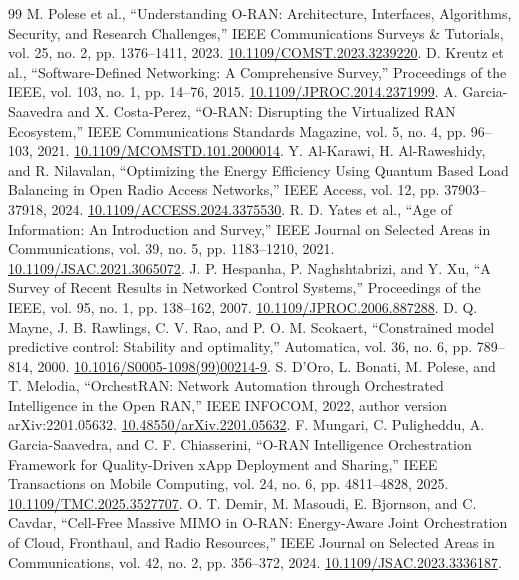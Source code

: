 \documentclass{IEEEoj}
\begin{document}
\small\begin{thebibliography}{99}\setlength{\itemsep}{2pt}
 M. Polese et al., ``Understanding O-RAN: Architecture, Interfaces, Algorithms, Security, and Research Challenges,'' IEEE Communications Surveys \& Tutorials, vol. 25, no. 2, pp. 1376--1411, 2023. \href{https://doi.org/10.1109/COMST.2023.3239220}{10.1109/COMST.2023.3239220}.
 D. Kreutz et al., ``Software-Defined Networking: A Comprehensive Survey,'' Proceedings of the IEEE, vol. 103, no. 1, pp. 14--76, 2015. \href{https://doi.org/10.1109/JPROC.2014.2371999}{10.1109/JPROC.2014.2371999}.
 A. Garcia-Saavedra and X. Costa-Perez, ``O-RAN: Disrupting the Virtualized RAN Ecosystem,'' IEEE Communications Standards Magazine, vol. 5, no. 4, pp. 96--103, 2021. \href{https://doi.org/10.1109/MCOMSTD.101.2000014}{10.1109/MCOMSTD.101.2000014}.
 Y. Al-Karawi, H. Al-Raweshidy, and R. Nilavalan, ``Optimizing the Energy Efficiency Using Quantum Based Load Balancing in Open Radio Access Networks,'' IEEE Access, vol. 12, pp. 37903--37918, 2024. \href{https://doi.org/10.1109/ACCESS.2024.3375530}{10.1109/ACCESS.2024.3375530}.
 R. D. Yates et al., ``Age of Information: An Introduction and Survey,'' IEEE Journal on Selected Areas in Communications, vol. 39, no. 5, pp. 1183--1210, 2021. \href{https://doi.org/10.1109/JSAC.2021.3065072}{10.1109/JSAC.2021.3065072}.
 J. P. Hespanha, P. Naghshtabrizi, and Y. Xu, ``A Survey of Recent Results in Networked Control Systems,'' Proceedings of the IEEE, vol. 95, no. 1, pp. 138--162, 2007. \href{https://doi.org/10.1109/JPROC.2006.887288}{10.1109/JPROC.2006.887288}.
 D. Q. Mayne, J. B. Rawlings, C. V. Rao, and P. O. M. Scokaert, ``Constrained model predictive control: Stability and optimality,'' Automatica, vol. 36, no. 6, pp. 789--814, 2000. \href{https://doi.org/10.1016/S0005-1098(99)00214-9}{10.1016/S0005-1098(99)00214-9}.
 S. D'Oro, L. Bonati, M. Polese, and T. Melodia, ``OrchestRAN: Network Automation through Orchestrated Intelligence in the Open RAN,'' IEEE INFOCOM, 2022, author version arXiv:2201.05632. \href{https://doi.org/10.48550/arXiv.2201.05632}{10.48550/arXiv.2201.05632}.
 F. Mungari, C. Puligheddu, A. Garcia-Saavedra, and C. F. Chiasserini, ``O-RAN Intelligence Orchestration Framework for Quality-Driven xApp Deployment and Sharing,'' IEEE Transactions on Mobile Computing, vol. 24, no. 6, pp. 4811--4828, 2025. \href{https://doi.org/10.1109/TMC.2025.3527707}{10.1109/TMC.2025.3527707}.
 O. T. Demir, M. Masoudi, E. Bjornson, and C. Cavdar, ``Cell-Free Massive MIMO in O-RAN: Energy-Aware Joint Orchestration of Cloud, Fronthaul, and Radio Resources,'' IEEE Journal on Selected Areas in Communications, vol. 42, no. 2, pp. 356--372, 2024. \href{https://doi.org/10.1109/JSAC.2023.3336187}{10.1109/JSAC.2023.3336187}.

\end{thebibliography}
\end{document}
